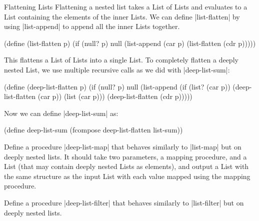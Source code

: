 \begin{schemeregion}
\begin{examplenobar}{Flattening Lists}
Flattening a nested list takes a List of Lists and evaluates to a List containing the elements of the inner Lists.  We can define \scheme|list-flatten| by using \scheme|list-append| to append all the inner Lists together.

\begin{schemedisplay}
(define (list-flatten p)
  (if (null? p) null
      (list-append (car p) (list-flatten (cdr p)))))
\end{schemedisplay}

This flattens a List of Lists into a single List.  To completely flatten a deeply nested List, we use multiple recursive calls as we did with \scheme|deep-list-sum|:
\begin{schemedisplay}
(define (deep-list-flatten p)
  (if (null? p) null
      (list-append (if (list? (car p))
                       (deep-list-flatten (car p))
                       (list (car p)))
                   (deep-list-flatten (cdr p)))))
\end{schemedisplay}
Now we can define \scheme|deep-list-sum| as: 
\begin{schemedisplay}
(define deep-list-sum (fcompose deep-list-flatten list-sum))
\end{schemedisplay}

\beforeex
\begin{exercise}\goldstar 
Define a procedure \scheme|deep-list-map| that behaves similarly to \scheme|list-map| but on deeply nested lists.  It should take two parameters, a mapping procedure, and a List (that may contain deeply nested Lists as elements), and output a List with the same structure as the input List with each value mapped using the mapping procedure.
\solution{\LATER{}}
\end{exercise}
\afterex

\beforeex
\begin{exercise} \goldstar 
Define a procedure \scheme|deep-list-filter| that behaves similarly to \scheme|list-filter| but on deeply nested lists.
\solution{\LATER{}}
\end{exercise}
\afterex

\end{examplenobar}

\end{schemeregion}

